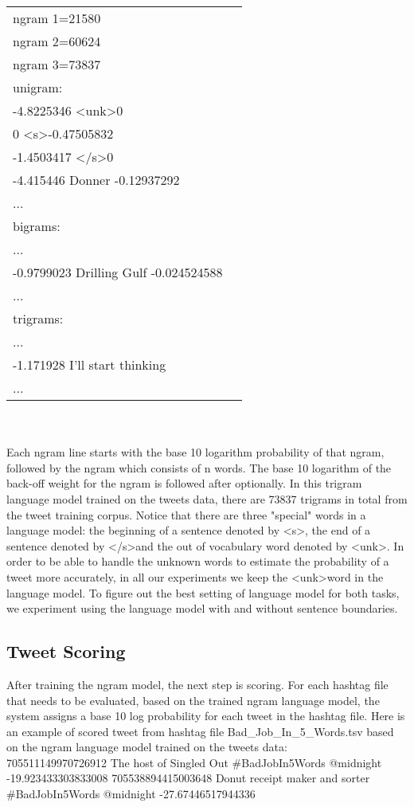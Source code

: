 \documentclass[11pt,a4paper]{article}
\begin{document}
\begin{tabular}{ |l |c|}
\hline
ngram 1=21580 \\
ngram 2=60624 \\
ngram 3=73837 \\
\hline
unigram:\\
-4.8225346   \textless unk\textgreater  0 \\
0   \textless s\textgreater  -0.47505832 \\
-1.4503417   \textless /s\textgreater  0 \\
-4.415446   Donner  -0.12937292 \\
...\\
\hline
bigrams:\\
...\\
-0.9799023  Drilling Gulf -0.024524588\\
...\\
\hline
trigrams:\\
...\\
-1.171928 I'll start thinking\\
...\\
\hline
\end{tabular}
\\\\
Each ngram line starts with the base 10 logarithm probability of that ngram, followed by the ngram which consists of n words. The base 10 logarithm of the back-off weight for the ngram is followed after optionally. In this trigram language model trained on the tweets data, there are 73837 trigrams in total from the tweet training corpus. Notice that there are three "special" words in a language model: the beginning of a sentence denoted by \textless s\textgreater, the end of a sentence denoted by \textless /s\textgreater and the out of vocabulary word denoted by \textless unk\textgreater. In order to be able to handle the unknown words to estimate the probability of a tweet more accurately, in all our experiments we keep the \textless unk\textgreater word in the language model. To figure out the best setting of language model for both tasks, we experiment using the language model with and without sentence boundaries.

\subsection{Tweet Scoring}
After training the ngram model, the next step is scoring. For each hashtag file that needs to be evaluated, based on the trained ngram language model, the system assigns a base 10 log probability for each tweet in the hashtag file. Here is an example of scored tweet from hashtag file Bad\_Job\_In\_5\_Words.tsv based on the ngram language model trained on the tweets data:\\
705511149970726912  The host of Singled Out \#BadJobIn5Words @midnight -19.923433303833008
705538894415003648  Donut receipt maker and sorter  \#BadJobIn5Words @midnight -27.67446517944336
\end{document}
